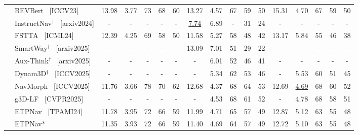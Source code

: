 \documentclass{article}
\theoremstyle{plain}
\theoremstyle{definition}
\theoremstyle{remark}
\begin{document}
\begin{table}[thpb]
{\begin{threeparttable}
\begin{tabular}{@{}c|l|ccccccccccccccc@{}}
			& BEVBert~\cite{an2023bevbert} {\scriptsize {\color{Gray} [ICCV23]}}& 13.98 & 3.77 & 73 & 68 & \multicolumn{1}{c|}{60} & 13.27 & 4.57 & 67 & 59 & \multicolumn{1}{c|}{50} & 15.31 & 4.70 & 67 & 59 & 50 \\ 
            & {InstructNav$^\dagger$}~\cite{long2024instructnav} {\scriptsize {\color{Gray} [arxiv2024]}}& - & - & - & - & \multicolumn{1}{c|}{-} & \underline{7.74} & 6.89 & - & 31 &\multicolumn{1}{c|}{24} & - & - & - & - & - \\
			& FSTTA~\cite{gao2024fast} {\scriptsize {\color{Gray} [ICML24]}}& 12.39 & 4.25 & 69 & 58 & \multicolumn{1}{c|}{50} & 11.58 & 5.27 & 58 & 48 & \multicolumn{1}{c|}{42} & 13.17 & 5.84 & 55 & 46 & 38 \\ 
            & {SmartWay$^\dagger$}~\cite{shi2025smartway} {\scriptsize {\color{Gray} [arxiv2025]}}& - & - & - & - & \multicolumn{1}{c|}{-} & 13.09 & 7.01 & 51 & 29 &\multicolumn{1}{c|}{22} & - & - & - & - & - \\
            & {Aux-Think$^\dagger$}~\cite{wang2025think} {\scriptsize {\color{Gray} [arxiv2025]}}& - & - & - & - & \multicolumn{1}{c|}{-} & - & 6.01 & 52 & 46 &\multicolumn{1}{c|}{41} & - & - & - & - & - \\
            & {Dynam3D$^\dagger$}~\cite{wang2025dynam3d} {\scriptsize {\color{Gray} [ICCV2025]}} & - & - & - & - & \multicolumn{1}{c|}{-} & - & 5.34  & 62 & 53 & \multicolumn{1}{c|}{46} & - & 5.53 & 60 & 51 & 45 \\ 
           & NavMorph~\cite{Yao2025navmorph} {\scriptsize {\color{Gray} [ICCV2025]}} & 11.76 & 3.66 & 78 & 70 & \multicolumn{1}{c|}{62} & 12.68 & 4.37 & 68 & 64 & \multicolumn{1}{c|}{53} & 12.69 & \underline{4.69} & 68 & 60 & 52 \\ 
           & g3D-LF~\cite{wang2025g3d} {\scriptsize {\color{Gray} [CVPR2025]}} & - & - & - & - & \multicolumn{1}{c|}{-} & - & 4.53 & 68 & 61 & \multicolumn{1}{c|}{52} & - & 4.78 & 68 &58 & 51 \\
             \cmidrule(l){2-17} 
              & ETPNav~\cite{an2024etpnav} {\scriptsize {\color{Gray} [TPAMI24]}}& 11.78 & 3.95 & 72 & 66 & \multicolumn{1}{c|}{59} & 11.99 & 4.71 & 65 & 57 & \multicolumn{1}{c|}{49} & 12.87 & 5.12 & 63 & 55 & 48 \\ 
              & \cellcolor{gray!5}ETPNav* & \multicolumn{1}{c}{\cellcolor{gray!5}11.35} & \multicolumn{1}{c}{\cellcolor{gray!5}3.93} & \multicolumn{1}{c}{\cellcolor{gray!5}72} & \multicolumn{1}{c}{\cellcolor{gray!5}66} &\multicolumn{1}{c|}{\cellcolor{gray!5}59} & \multicolumn{1}{c}{\cellcolor{gray!5}11.40} & \multicolumn{1}{c}{\cellcolor{gray!5}4.69} & \multicolumn{1}{c}{\cellcolor{gray!5}64} & \multicolumn{1}{c}{\cellcolor{gray!5}57} & \multicolumn{1}{c|}{\cellcolor{gray!5}49} & \cellcolor{gray!5}12.72 & \cellcolor{gray!5}5.10 & \cellcolor{gray!5}63 & \cellcolor{gray!5}55 & \cellcolor{gray!5}48 \\

\end{tabular}
\end{threeparttable}}
\end{table}
\end{document}
